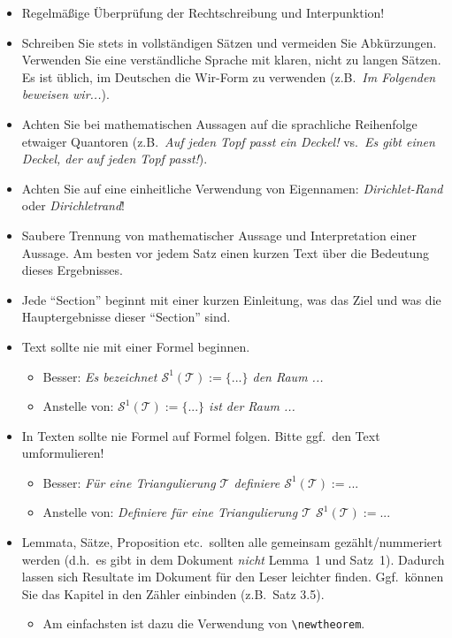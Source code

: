 {\color{change}
\begin{itemize}

\item Regelmäßige Überprüfung der Rechtschreibung und Interpunktion!
\item Schreiben Sie stets in vollständigen Sätzen und vermeiden Sie Abkürzungen.  Verwenden Sie eine verständliche Sprache mit klaren, nicht zu langen Sätzen. Es ist üblich, im Deutschen die Wir-Form zu verwenden (z.B.\ \emph{Im Folgenden beweisen wir...}).

\item Achten Sie bei mathematischen Aussagen auf die sprachliche Reihenfolge etwaiger Quantoren (z.B.\ \emph{Auf jeden Topf passt ein Deckel!} vs.\ \emph{Es gibt einen Deckel, der auf jeden Topf passt!}).

\item Achten Sie auf eine einheitliche Verwendung von Eigennamen: \emph{Dirichlet-Rand} oder \emph{Dirichletrand}!

\item Saubere Trennung von mathematischer Aussage und Interpretation einer Aussage. Am besten vor jedem Satz einen kurzen Text über die Bedeutung dieses Ergebnisses.
\item Jede "`Section"' beginnt mit einer kurzen Einleitung, was das Ziel und was die Hauptergebnisse dieser "`Section"' sind.

\item Text sollte nie mit einer Formel beginnen.
\begin{itemize}
\item Besser: \emph{Es bezeichnet $\mathcal{S}^1(\mathcal{T}) := \big\{ ... \big\}$ den Raum ...}
\item Anstelle von: \emph{$\mathcal{S}^1(\mathcal{T}) := \big\{ ... \big\}$ ist der Raum ...}
\end{itemize}

\item In Texten sollte nie Formel auf Formel folgen. Bitte ggf.\ den Text umformulieren!
\begin{itemize}
\item Besser: \emph{Für eine Triangulierung $\mathcal{T}$ definiere $\mathcal{S}^1(\mathcal{T}) := ...$}
\item Anstelle von: \emph{Definiere für eine Triangulierung $\mathcal{T}$ $\mathcal{S}^1(\mathcal{T}) := ...$}
\end{itemize}

\item Lemmata, Sätze, Proposition etc.\ sollten alle gemeinsam gezählt/nummeriert werden (d.h.\ es gibt in dem Dokument \emph{nicht} Lemma~1 und Satz~1). Dadurch lassen sich Resultate im Dokument für den Leser leichter finden. Ggf.\ können Sie das Kapitel in den Zähler einbinden (z.B.\ Satz 3.5).
\begin{itemize}
\item Am einfachsten ist dazu die Verwendung von \verb$\newtheorem$.
\end{itemize}


\end{itemize}}
